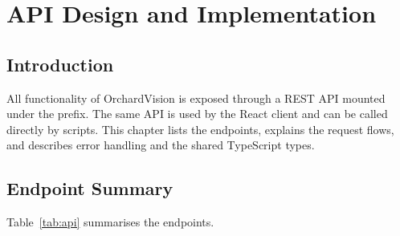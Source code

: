 \chapter{API Design and Implementation}

\section{Introduction}

All functionality of OrchardVision is exposed through a REST API mounted under the  prefix. The same API is used by the React client and can be called directly by scripts. This chapter lists the endpoints, explains the request flows, and describes error handling and the shared TypeScript types.

\section{Endpoint Summary}

Table~\ref{tab:api} summarises the endpoints.

